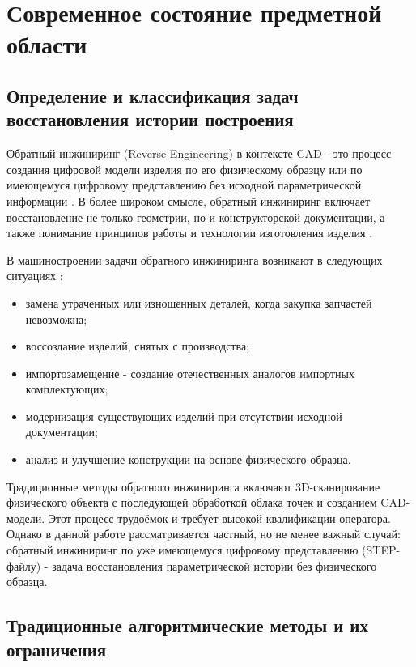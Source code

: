 
\section{Современное состояние предметной области}

\subsection{Определение и классификация задач восстановления истории построения}

Обратный инжиниринг (Reverse Engineering) в контексте CAD - это процесс создания цифровой модели изделия по его физическому образцу или по имеющемуся цифровому представлению без исходной параметрической информации \cite{tulmash2025}. В более широком смысле, обратный инжиниринг включает восстановление не только геометрии, но и конструкторской документации, а также понимание принципов работы и технологии изготовления изделия \cite{interpolyaris2022}.

В машиностроении задачи обратного инжиниринга возникают в следующих ситуациях \cite{ritm2025}:
\begin{itemize}
\item замена утраченных или изношенных деталей, когда закупка запчастей невозможна;
\item воссоздание изделий, снятых с производства;
\item импортозамещение - создание отечественных аналогов импортных комплектующих;
\item модернизация существующих изделий при отсутствии исходной документации;
\item анализ и улучшение конструкции на основе физического образца.
\end{itemize}

Традиционные методы обратного инжиниринга включают 3D-сканирование физического объекта с последующей обработкой облака точек и созданием CAD-модели. Этот процесс трудоёмок и требует высокой квалификации оператора. Однако в данной работе рассматривается частный, но не менее важный случай: обратный инжиниринг по уже имеющемуся цифровому представлению (STEP-файлу) - задача восстановления параметрической истории без физического образца.

\subsection{Традиционные алгоритмические методы и их ограничения}


